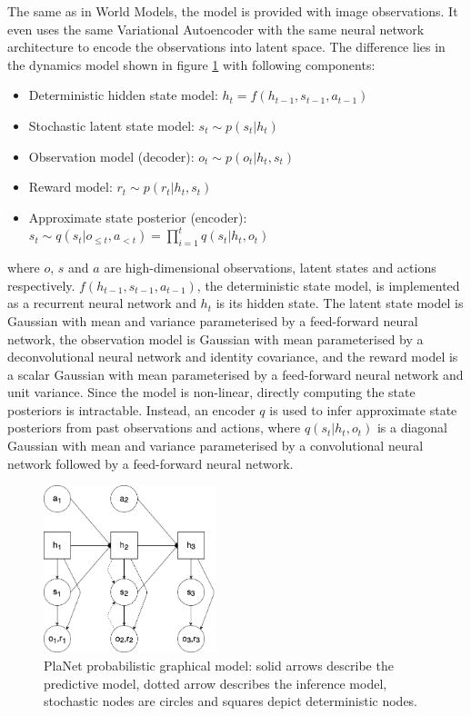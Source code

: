 The same as in World Models, the model is provided with image observations. It even uses the same Variational Autoencoder with the same neural network architecture to encode the observations into latent space. The difference lies in the dynamics model shown in figure \ref{Fig.PlaNetPGM} with following components:
\begin{itemize}
\item Deterministic hidden state model:      $h_t = f(h_{t-1}, s_{t-1}, a_{t-1})$
\item Stochastic latent state model:         $s_t \sim p(s_t|h_t)$
\item Observation model (decoder):           $o_t \sim p(o_t|h_t, s_t)$
\item Reward model:                          $r_t \sim p(r_t|h_t, s_t)$
\item Approximate state posterior (encoder): $s_t \sim q(s_t|o_{\leqslant t}, a_{< t}) = \prod_{i=1}^tq(s_t|h_t,o_t)$
\end{itemize}
where $o$, $s$ and $a$ are high-dimensional observations, latent states and actions respectively. $f(h_{t-1}, s_{t-1}, a_{t-1})$, the deterministic state model, is implemented as a recurrent neural network and $h_t$ is its hidden state. The latent state model is Gaussian with mean and variance parameterised by a feed-forward neural network, the observation model is Gaussian with mean parameterised by a deconvolutional neural network and identity covariance, and the reward model is a scalar Gaussian with mean parameterised by a feed-forward neural network and unit variance. Since the model is non-linear, directly computing the state posteriors is intractable. Instead, an encoder $q$ is used to infer approximate state posteriors from past observations and actions, where $q(s_t | h_t, o_t)$ is a diagonal Gaussian with mean and variance parameterised by a convolutional neural network followed by a feed-forward neural network.

\begin{figure}[H]
\includegraphics[width=0.45\textwidth,keepaspectratio]{figures/PlaNet/prob_graph_model.png}
\caption[World Models probabilistic graphical model]{PlaNet probabilistic graphical model: solid arrows describe the predictive model, dotted arrow describes the inference model, stochastic nodes are circles and squares depict deterministic nodes.}
\label{Fig.PlaNetPGM}
\end{figure}

